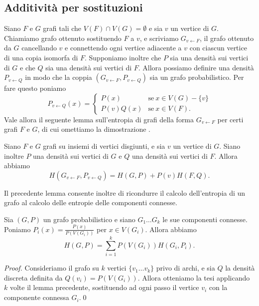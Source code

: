 \newpage

\subsection{Additività per sostituzioni}
Siano \(F\) e \(G\) grafi tali che \(V(F)\cap V(G) = \emptyset\) e sia \(v\) un vertice di \(G\). Chiamiamo grafo ottenuto sostituendo \(F\) a \(v\), e scriviamo \(G_{v\leftarrow F}\), il grafo ottenuto da \(G\) cancellando \(v\) e connettendo ogni vertice adiacente a \(v\) con ciascun vertice di una copia isomorfa di \(F\). Supponiamo inoltre che \(P\) sia una densità sui vertici di \(G\) e che \(Q\) sia una densità sui vertici di \(F\). Allora possiamo definire una densità \(P_{v\leftarrow Q}\) in modo che la coppia \((G_{v\leftarrow F}, P_{v\leftarrow Q})\) sia un grafo probabilistico. Per fare questo poniamo
\[P_{v\leftarrow Q}(x)= 
\begin{cases}
  P(x) & \text{se}\ x\in V(G)-\{v\}\\
  P(v)Q(x) & \text{se}\ x\in V(F)\text{.}
\end{cases}
\]
Vale allora il seguente lemma sull'entropia di grafi della forma \(G_{v\leftarrow F}\) per certi grafi \(F\) e \(G\), di cui omettiamo la dimostrazione \cite{Korner1992}.
\begin{lemma}
  Siano \(F\) e \(G\) grafi su insiemi di vertici disgiunti, e sia \(v\) un vertice di \(G\). Siano inoltre \(P\) una densità sui vertici di \(G\) e \(Q\) una densità sui vertici di \(F\). Allora abbiamo
  \[H(G_{v\leftarrow F}, P_{v\leftarrow Q})=H(G,P)+P(v)H(F,Q).\]
\end{lemma}
Il precedente lemma consente inoltre di ricondurre il calcolo dell'entropia di un grafo al calcolo delle entropie delle componenti connesse.
\begin{corollary}
  Sia \((G,P)\) un grafo probabilistico e siano \(G_{1}\dots G_{k}\) le sue componenti connesse. Poniamo \(P_i(x)=\frac{P(x)}{P(V(G_i))}\) per \(x\in V(G_i)\). Allora abbiamo
  \[H(G,P)=\sum_{i=1}^k P(V(G_i))H(G_i,P_i).\]
\end{corollary}
\begin{proof}
  Consideriamo il grafo su \(k\) vertici \(\{v_{1}\dots v_{k}\}\) privo di archi, e sia \(Q\) la densità discreta definita da \(Q(v_{i}) = P(V(G_i))\). Allora otteniamo la tesi applicando \(k\) volte il lemma precedente, sostituendo ad ogni passo il vertice \(v_i\) con la componente connessa \(G_{i}\).\qed 
\end{proof}


